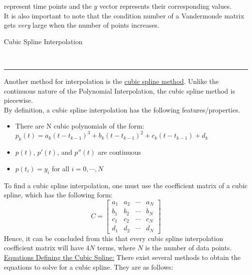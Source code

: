 \documentclass{article}
\newcommand{\header}[1]{\begin{large}\noindent #1\end{large}\\\rule{\textwidth}{0.5pt}}
\newcommand{\gap}{\medskip\\}
\begin{document}
represent time points and the $y$ vector represents their corresponding values.
\gap
It is also important to note that the condition number of a Vandermonde matrix gets
\textit{very} large when the number of points increases.
\gap
\header{Cubic Spline Interpolation}
Another method for interpolation is the \underline{cubic spline method}. Unlike the
continuous nature of the Polynomial Interpolation, the cubic spline method is 
piecewise.
\gap
By definition, a cubic spline interpolation has the following features/properties.
\begin{itemize}
    \item There are N cubic polynomials of the form:\\
    $
        p_k(t) = a_k(t - t_{k-1})^3 + b_k(t - t_{k-1})^2 + c_k(t - t_{k - 1}) + d_k    
    $
    \item $p(t)$, $p'(t)$, and $p''(t)$ are continuous
    \item $p(t_i) = y_i$ for all $i = 0, \cdots, N$
\end{itemize}
To find a cubic spline interpolation, one must use the coefficient matrix of a cubic
spline, which has the following form:
\[
    C = \begin{bmatrix}
        a_1 & a_2 & \cdots & a_N\\
        b_1 & b_2 & \cdots & b_N\\
        c_1 & c_2 & \cdots & c_N\\
        d_1 & d_2 & \cdots & d_N
    \end{bmatrix}    
\]
Hence, it can be concluded from this that every cubic spline interpolation coefficient
matrix will have $4N$ terms, where $N$ is the number of data points.
\gap
\underline{Equations Defining the Cubic Spline:} There exist several methods to obtain
the equations to solve for a cubic spline. They are as follows:
\end{document}
